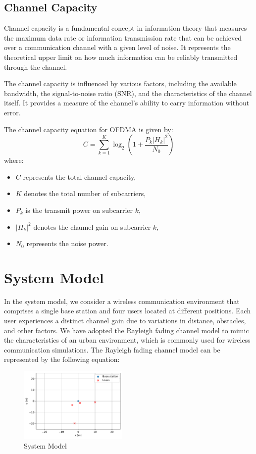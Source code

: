 \documentclass[conference]{IEEEtran}
\begin{document}
\subsection{Channel Capacity}
Channel capacity is a fundamental concept in information theory that measures the maximum data rate or information transmission rate that can be achieved over a communication channel with a given level of noise. It represents the theoretical upper limit on how much information can be reliably transmitted through the channel.

The channel capacity is influenced by various factors, including the available bandwidth, the signal-to-noise ratio (SNR), and the characteristics of the channel itself. It provides a measure of the channel's ability to carry information without error.

The channel capacity equation for OFDMA is given by:
$$
C = \sum_{k=1}^{K} \log_2 \left(1 + \frac{P_k |H_k|^2}{N_0}\right)
$$
where:
\begin{itemize}
  \item $C$ represents the total channel capacity,
  \item $K$ denotes the total number of subcarriers,
  \item $P_k$ is the transmit power on subcarrier $k$,
  \item $|H_k|^2$ denotes the channel gain on subcarrier $k$,
  \item $N_0$ represents the noise power.
\end{itemize}

\section{System Model}
In the system model, we consider a wireless communication environment that comprises a single base station and four users located at different positions. Each user experiences a distinct channel gain due to variations in distance, obstacles, and other factors. We have adopted the Rayleigh fading channel model to mimic the characteristics of an urban environment, which is commonly used for wireless communication simulations.
The Rayleigh fading channel model can be represented by the following equation:

\begin{figure}[t!]
    \centering
    \includegraphics[width=0.47\textwidth, height= 0.35\textwidth]{figures/system_model.pdf}
    \caption{System Model}
\end{figure}
\end{document}
